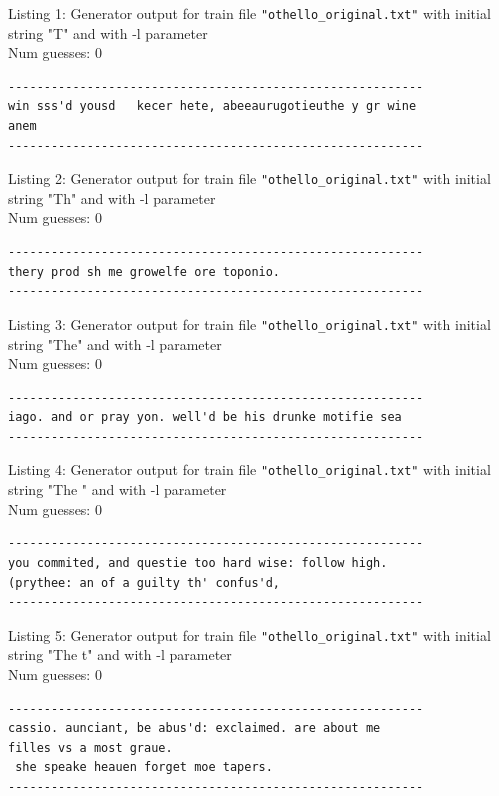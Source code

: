 \documentclass{article}
\begin{document}
Listing 1: Generator output for train file \verb|"othello_original.txt"| with initial string "T" and with -l parameter
\\Num guesses: 0

\begin{lstlisting}
----------------------------------------------------------
win sss'd yousd   kecer hete, abeeaurugotieuthe y gr wine 
anem
----------------------------------------------------------
\end{lstlisting}

Listing 2: Generator output for train file \verb|"othello_original.txt"| with initial string "Th" and with -l parameter
\\Num guesses: 0

\begin{lstlisting}
----------------------------------------------------------
thery prod sh me growelfe ore toponio.
----------------------------------------------------------
\end{lstlisting}

Listing 3: Generator output for train file \verb|"othello_original.txt"| with initial string "The" and with -l parameter
\\Num guesses: 0

\begin{lstlisting}
----------------------------------------------------------
iago. and or pray yon. well'd be his drunke motifie sea
----------------------------------------------------------
\end{lstlisting}

Listing 4: Generator output for train file \verb|"othello_original.txt"| with initial string "The " and with -l parameter
\\Num guesses: 0

\begin{lstlisting}
----------------------------------------------------------
you commited, and questie too hard wise: follow high. 
(prythee: an of a guilty th' confus'd,
----------------------------------------------------------
\end{lstlisting}

Listing 5: Generator output for train file \verb|"othello_original.txt"| with initial string "The t" and with -l parameter
\\Num guesses: 0

\begin{lstlisting}
----------------------------------------------------------
cassio. aunciant, be abus'd: exclaimed. are about me 
filles vs a most graue.
 she speake heauen forget moe tapers.
----------------------------------------------------------
\end{lstlisting}
\end{document}
